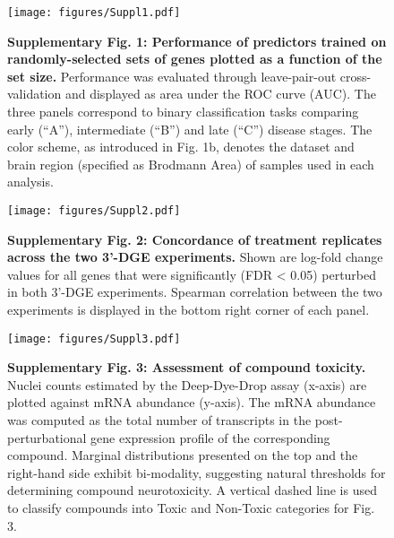 \documentclass{article}
\begin{document}

\begin{figure}
  \begin{center}
    \texttt{[image: figures/Suppl1.pdf]}
  \end{center}
  \caption*{\textbf{Supplementary Fig. 1: Performance of predictors trained on randomly-selected sets of genes plotted as a function of the set size.} Performance was evaluated through leave-pair-out cross-validation and displayed as area under the ROC curve (AUC). The three panels correspond to binary classification tasks comparing early (“A”), intermediate (“B”) and late (“C”) disease stages. The color scheme, as introduced in Fig. 1b, denotes the dataset and brain region (specified as Brodmann Area) of samples used in each analysis.}
\end{figure}


\begin{figure}
  \begin{center}
    \texttt{[image: figures/Suppl2.pdf]}
  \end{center}
\caption*{\textbf{Supplementary Fig. 2: Concordance of treatment replicates across the two 3’-DGE experiments.} Shown are log-fold change values for all genes that were significantly (FDR < 0.05) perturbed in both 3’-DGE experiments. Spearman correlation between the two experiments is displayed in the bottom right corner of each panel.}
\end{figure}


\begin{figure}
  \begin{center}
    \texttt{[image: figures/Suppl3.pdf]}
  \end{center}
  \caption*{\textbf{Supplementary Fig. 3: Assessment of compound toxicity.} Nuclei counts estimated by the Deep-Dye-Drop assay (x-axis) are plotted against mRNA abundance (y-axis). The mRNA abundance was computed as the total number of transcripts in the post-perturbational gene expression profile of the corresponding compound. Marginal distributions presented on the top and the right-hand side exhibit bi-modality, suggesting natural thresholds for determining compound neurotoxicity. A vertical dashed line is used to classify compounds into Toxic and Non-Toxic categories for Fig. 3.}
\end{figure}
\end{document}
